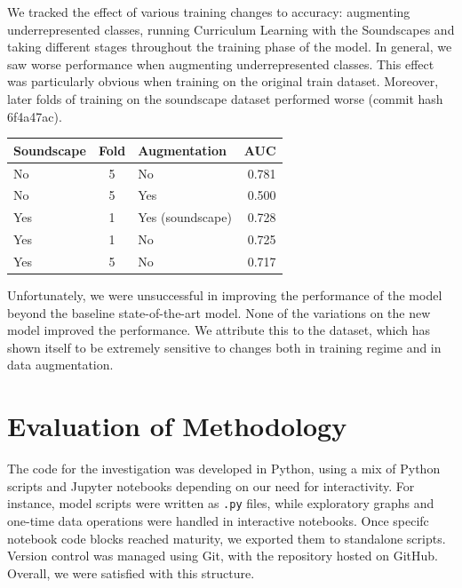 \documentclass[10pt]{article}
\begin{document}
\begin{minipage}{0.48\linewidth}
We tracked the effect of various training changes to accuracy: augmenting underrepresented classes, running Curriculum Learning with the Soundscapes and taking different stages throughout the training phase of the model. In general, we saw worse performance when augmenting underrepresented classes. This effect was particularly obvious when training on the original train dataset. Moreover, later folds of training on the soundscape dataset performed worse (commit hash 6f4a47ac).
\end{minipage}
\hfill
\begin{minipage}{0.48\linewidth}
\centering
\begin{tabular}{|l|c|l|r|}
\hline
\textbf{Soundscape} & \textbf{Fold} & \textbf{Augmentation} & \textbf{AUC} \\
\hline
No         & 5    & No               & 0.781 \\
No         & 5    & Yes              & 0.500 \\
Yes        & 1    & Yes (soundscape) & 0.728 \\
Yes        & 1    & No               & 0.725 \\
Yes        & 5    & No               & 0.717 \\
\hline
\end{tabular}
\end{minipage}

Unfortunately, we were unsuccessful in improving the performance of the model beyond the baseline state-of-the-art model. None of the variations on the new model improved the performance. We attribute this to the dataset, which has shown itself to be extremely sensitive to changes both in training regime and in data augmentation.

\section*{Evaluation of Methodology}

The code for the investigation was developed in Python, using a mix of Python scripts and Jupyter notebooks depending on our need for interactivity. For instance, model scripts were written as \texttt{.py} files, while exploratory graphs and one-time data operations were handled in interactive notebooks. Once specifc notebook code blocks reached maturity, we exported them to standalone scripts. Version control was managed using Git, with the repository hosted on GitHub. Overall, we were satisfied with this structure.
\end{document}
